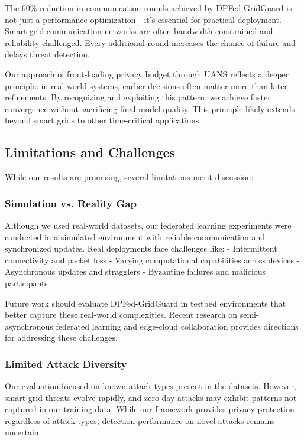 \documentclass{ieeeaccess}
\theoremstyle{definition}
\begin{document}
The 60\% reduction in communication rounds achieved by DPFed-GridGuard is not just a performance optimization—it's essential for practical deployment. Smart grid communication networks are often bandwidth-constrained and reliability-challenged. Every additional round increases the chance of failure and delays threat detection.

Our approach of front-loading privacy budget through UANS reflects a deeper principle: in real-world systems, earlier decisions often matter more than later refinements. By recognizing and exploiting this pattern, we achieve faster convergence without sacrificing final model quality. This principle likely extends beyond smart grids to other time-critical applications.

\subsection{Limitations and Challenges}

While our results are promising, several limitations merit discussion:

\subsubsection{Simulation vs. Reality Gap}

Although we used real-world datasets, our federated learning experiments were conducted in a simulated environment with reliable communication and synchronized updates. Real deployments face challenges like:
- Intermittent connectivity and packet loss
- Varying computational capabilities across devices
- Asynchronous updates and stragglers
- Byzantine failures and malicious participants

Future work should evaluate DPFed-GridGuard in testbed environments that better capture these real-world complexities. Recent research on semi-asynchronous federated learning \cite{husnoo2023fedisa} and edge-cloud collaboration \cite{yin2021secure, taik2020electrical} provides directions for addressing these challenges.

\subsubsection{Limited Attack Diversity}

Our evaluation focused on known attack types present in the datasets. However, smart grid threats evolve rapidly, and zero-day attacks may exhibit patterns not captured in our training data. While our framework provides privacy protection regardless of attack types, detection performance on novel attacks remains uncertain.
\end{document}
